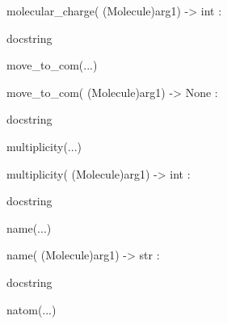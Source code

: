 \documentclass[letterpaper,10pt,english]{sphinxmanual}
\begin{document}
\begin{description}
\begin{description}
\begin{DUlineblock}{0em}
\item[]
\begin{DUlineblock}{\DUlineblockindent}
\item[] molecular\_charge( (Molecule)arg1) -\textgreater{} int :
\item[]
\begin{DUlineblock}{\DUlineblockindent}
\item[] docstring
\item[] 
\end{DUlineblock}
\end{DUlineblock}
\item[] move\_to\_com(...)
\item[]
\begin{DUlineblock}{\DUlineblockindent}
\item[] move\_to\_com( (Molecule)arg1) -\textgreater{} None :
\item[]
\begin{DUlineblock}{\DUlineblockindent}
\item[] docstring
\item[] 
\end{DUlineblock}
\end{DUlineblock}
\item[] multiplicity(...)
\item[]
\begin{DUlineblock}{\DUlineblockindent}
\item[] multiplicity( (Molecule)arg1) -\textgreater{} int :
\item[]
\begin{DUlineblock}{\DUlineblockindent}
\item[] docstring
\item[] 
\end{DUlineblock}
\end{DUlineblock}
\item[] name(...)
\item[]
\begin{DUlineblock}{\DUlineblockindent}
\item[] name( (Molecule)arg1) -\textgreater{} str :
\item[]
\begin{DUlineblock}{\DUlineblockindent}
\item[] docstring
\item[] 
\end{DUlineblock}
\end{DUlineblock}
\item[] natom(...)
\item[]

\end{DUlineblock}
\end{description}
\end{description}
\end{document}
